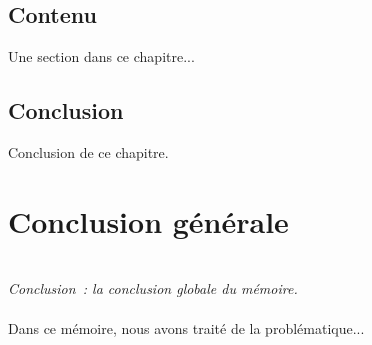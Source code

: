 \documentclass[a4paper,11pt,twoside]{memoir}
\begin{document}
\section{Contenu}
Une section dans ce chapitre...

\section{Conclusion}
Conclusion de ce chapitre.



\cleardoublepage{} %
\chapter*{Conclusion générale}
\adjustmtc
{}
\textit{\\Conclusion~: la conclusion globale du mémoire.}\\\\
Dans ce mémoire, nous avons traité de la problématique...\\\\




\cleardoublepage{}
 

\appendix
\cleardoublepage{}

%



\cleardoublepage %
\printindex %

\end{document}
